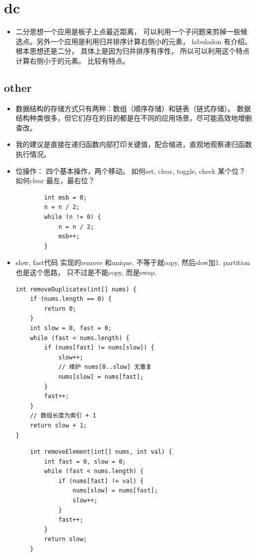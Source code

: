 \documentclass[a4paper,11pt,twoside]{book}
\begin{document}
\section{dc}
\begin{itemize}
	\item 二分思想一个应用是板子上点最近距离， 可以利用一个子问题来剪掉一些候选点。另外一个应用是利用归并排序计算右侧小的元素， labuladon 有介绍。根本思想还是二分， 具体上是因为归并排序有序性， 所以可以利用这个特点计算右侧小于的元素。 比较有特点。	
\end{itemize}

\begin{itemize}

\section{other}
\begin{itemize}
	\item 	数据结构的存储方式只有两种：数组（顺序存储）和链表（链式存储）。 数据结构种类很多，但它们存在的目的都是在不同的应用场景，尽可能高效地增删查改。
	
	\item 	我的建议是直接在递归函数内部打印关键值，配合缩进，直观地观察递归函数执行情况。
	
	\item 位操作： 四个基本操作，两个移动。 如何set, clear, toggle, check 某个位？ 如何clear 最左，最右位？ 
	
	\begin{lstlisting}
		int msb = 0;
		n = n / 2;
		while (n != 0) {
			n = n / 2;
			msb++;
		}
	\end{lstlisting}

\item slow, fast代码 实现的remove 和unique.  不等于就copy, 然后slow加1. partition 也是这个思路， 只不过是不能copy, 而是swap. 
	\begin{lstlisting}
int removeDuplicates(int[] nums) {
	if (nums.length == 0) {
		return 0;
	}
	int slow = 0, fast = 0;
	while (fast < nums.length) {
		if (nums[fast] != nums[slow]) {
			slow++;
			// 维护 nums[0..slow] 无重复
			nums[slow] = nums[fast];
		}
		fast++;
	}
	// 数组长度为索引 + 1
	return slow + 1;
}
	\end{lstlisting}

	\begin{lstlisting}
	int removeElement(int[] nums, int val) {
		int fast = 0, slow = 0;
		while (fast < nums.length) {
			if (nums[fast] != val) {
				nums[slow] = nums[fast];
				slow++;
			}
			fast++;
		}
		return slow;
	}
\end{lstlisting}


\end{itemize}
\end{itemize}
\end{document}
